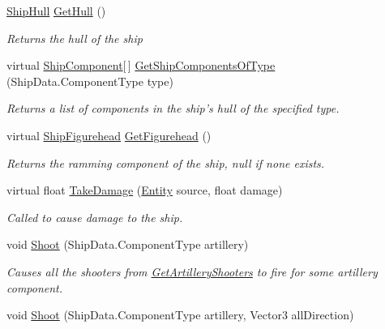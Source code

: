 \begin{DoxyCompactItemize}
\item 
\hyperlink{class_skyrates_1_1_ship_1_1_ship_hull}{Ship\-Hull} \hyperlink{class_skyrates_1_1_entity_1_1_entity_ship_a4924d36536b94a66db8848fa462ffb9b}{Get\-Hull} ()
\begin{DoxyCompactList}\small\item\em Returns the hull of the ship \end{DoxyCompactList}\item 
virtual \hyperlink{class_skyrates_1_1_ship_1_1_ship_component}{Ship\-Component}\mbox{[}$\,$\mbox{]} \hyperlink{class_skyrates_1_1_entity_1_1_entity_ship_afcff893543bdd7f3727747527bbef62d}{Get\-Ship\-Components\-Of\-Type} (Ship\-Data.\-Component\-Type type)
\begin{DoxyCompactList}\small\item\em Returns a list of components in the ship's hull of the specified type. \end{DoxyCompactList}\item 
virtual \hyperlink{class_skyrates_1_1_ship_1_1_ship_figurehead}{Ship\-Figurehead} \hyperlink{class_skyrates_1_1_entity_1_1_entity_ship_a266bd486dd19d986af0580085aaf795d}{Get\-Figurehead} ()
\begin{DoxyCompactList}\small\item\em Returns the ramming component of the ship, null if none exists. \end{DoxyCompactList}\item 
virtual float \hyperlink{class_skyrates_1_1_entity_1_1_entity_ship_a3ad30bc27cf8344c4acbfea78f8ee373}{Take\-Damage} (\hyperlink{class_skyrates_1_1_entity_1_1_entity}{Entity} source, float damage)
\begin{DoxyCompactList}\small\item\em Called to cause damage to the ship. \end{DoxyCompactList}\item 
void \hyperlink{class_skyrates_1_1_entity_1_1_entity_ship_ab8b29253f4934d846919a1020d01d5bc}{Shoot} (Ship\-Data.\-Component\-Type artillery)
\begin{DoxyCompactList}\small\item\em Causes all the shooters from \hyperlink{class_skyrates_1_1_entity_1_1_entity_ship_a75c4b113dd48dba91c0abaaa1372ed1a}{Get\-Artillery\-Shooters} to fire for some artillery component. \end{DoxyCompactList}\item 
void \hyperlink{class_skyrates_1_1_entity_1_1_entity_ship_a5a6db8ceccf49166e10794393d5100a4}{Shoot} (Ship\-Data.\-Component\-Type artillery, Vector3 all\-Direction)

\end{DoxyCompactItemize}
